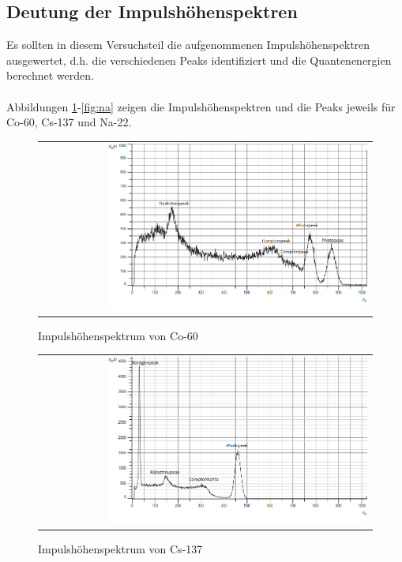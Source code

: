\documentclass[a4paper,titlepage]{scrartcl}
\numberwithin{equation}{section}
\begin{document}
\subsection{Deutung der Impulshöhenspektren}
Es sollten in diesem Versuchsteil die aufgenommenen Impulshöhenspektren ausgewertet, d.h. die verschiedenen Peaks identifiziert und die Quantenenergien berechnet werden.\\ \\
Abbildungen \ref{fig:co}-\ref{fig:na} zeigen die Impulshöhenspektren und die Peaks jeweils für Co-60, Cs-137 und Na-22.
\begin{figure}[H]
		\centering
		\begin{tabular}{@{}r@{}}
			\includegraphics[width=0.8\textwidth]{bilder/aufgabe1/co60.png}\\
		\end{tabular}
		\caption{Impulshöhenspektrum von Co-60}
		\label{fig:co}
\end{figure}
\begin{figure}[H]
		\centering
		\begin{tabular}{@{}r@{}}
			\includegraphics[width=0.8\textwidth]{bilder/aufgabe1/cs137.png}\\
		\end{tabular}
		\caption{Impulshöhenspektrum von Cs-137}
		\label{fig:cs}
\end{figure}
\end{document}
